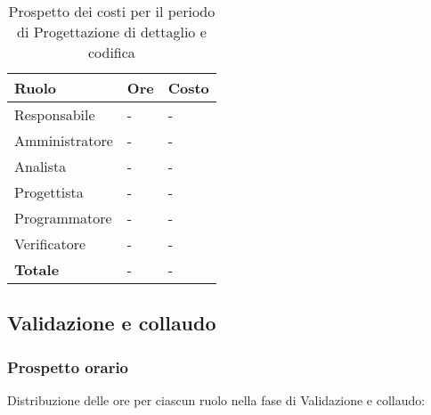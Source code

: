 		\begin{longtable}{ 
			>{\centering}p{} 
			>{\centering}p{}
			>{\centering\arraybackslash}p{} }
	
			\caption {Prospetto dei costi per il periodo di Progettazione di dettaglio e codifica} \\
			
			\textbf{\color{white}Ruolo} & 
			\textbf{\color{white}Ore} & 
			\textbf{\color{white}Costo }
			\tabularnewline  
			\endhead
			
			Responsabile & - & - \\
			Amministratore & - & - \\
			Analista & - & - \\
			Progettista & - & - \\
			Programmatore & - & - \\
			Verificatore & - & - \\
			\textbf{Totale} & - & - \\
		\end{longtable}
		

\subsection{Validazione e collaudo}
	\subsubsection{Prospetto orario}
	Distribuzione delle ore per ciascun ruolo nella fase di Validazione e collaudo:
		
